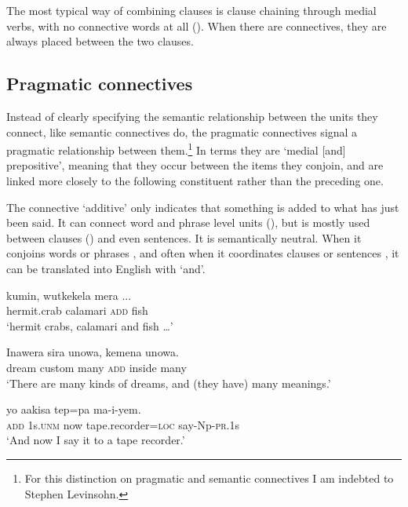 The most typical way of combining clauses is clause chaining through medial verbs, with no connective words at all (). When there are connectives, they are always placed between the two clauses. 

\subsection{Pragmatic connectives}\label{sec:3.11.1}
{}
Instead of clearly specifying the semantic relationship between the units they connect, like semantic connectives do, the pragmatic connectives signal a pragmatic relationship between them.\footnote{For this distinction on pragmatic and semantic connectives I am indebted to Stephen Levinsohn.} In  terms they are `medial [and] prepositive', meaning that they occur between the items they conjoin, and are linked more closely to the following constituent rather than the preceding one.

The connective  `additive' only indicates that something is added to what has just been said. It can connect word and phrase level units (), but is mostly used between clauses () and even sentences. It is semantically neutral. When it conjoins words  or phrases , and often when it coordinates clauses  or sentences , it can be translated into English with `and'. 

\ea%
\label{ex:3:x711}
\gll kumin, wutkekela  mera ... \\
hermit.crab calamari \textsc{add} fish\\
\glt`hermit crabs, calamari and fish {\dots}'
\z

\ea%
\label{ex:3:x713}
\gll Inawera sira unowa,  kemena unowa. \\
dream custom many \textsc{add} inside many\\
\glt`There are many kinds of dreams, and (they have) many meanings.'
\z

\ea%
\label{ex:3:x714}
\gll {} yo aakisa tep=pa ma-i-yem. \\
\textsc{add} 1s.\textsc{unm} now tape.recorder=\textsc{loc} say-Np-\textsc{pr}.1s\\
\glt`And now I say it to a tape recorder.'
\z

